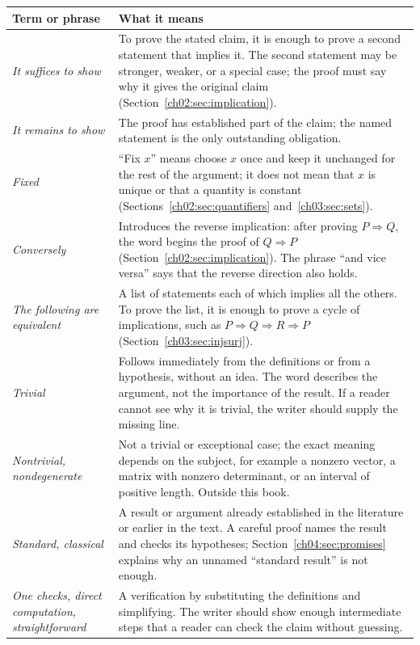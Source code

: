\begin{longtable}{@{}>{\raggedright\arraybackslash}p{1.35in}>{\raggedright\arraybackslash}p{3.85in}@{}}
\toprule Term or phrase & What it means\\\midrule\endhead
\emph{It suffices to show} & To prove the stated claim, it is enough to prove a second statement that implies it. The second statement may be stronger, weaker, or a special case; the proof must say why it gives the original claim (Section~\ref{ch02:sec:implication}).\\
\emph{It remains to show} & The proof has established part of the claim; the named statement is the only outstanding obligation.\\
\emph{Fixed} & ``Fix $x$'' means choose $x$ once and keep it unchanged for the rest of the argument; it does not mean that $x$ is unique or that a quantity is constant (Sections~\ref{ch02:sec:quantifiers} and~\ref{ch03:sec:sets}).\\
\emph{Conversely} & Introduces the reverse implication: after proving $P\Rightarrow Q$, the word begins the proof of $Q\Rightarrow P$ (Section~\ref{ch02:sec:implication}). The phrase ``and vice versa'' says that the reverse direction also holds.\\
\emph{The following are equivalent} & A list of statements each of which implies all the others. To prove the list, it is enough to prove a cycle of implications, such as $P\Rightarrow Q\Rightarrow R\Rightarrow P$ (Section~\ref{ch03:sec:injsurj}).\\
\emph{Trivial} & Follows immediately from the definitions or from a hypothesis, without an idea. The word describes the argument, not the importance of the result. If a reader cannot see why it is trivial, the writer should supply the missing line.\\
\emph{Nontrivial, nondegenerate} & Not a trivial or exceptional case; the exact meaning depends on the subject, for example a nonzero vector, a matrix with nonzero determinant, or an interval of positive length. Outside this book.\\
\emph{Standard, classical} & A result or argument already established in the literature or earlier in the text. A careful proof names the result and checks its hypotheses; Section~\ref{ch04:sec:promises} explains why an unnamed ``standard result'' is not enough.\\
\emph{One checks, direct computation, straightforward} & A verification by substituting the definitions and simplifying. The writer should show enough intermediate steps that a reader can check the claim without guessing.\\

\end{longtable}
